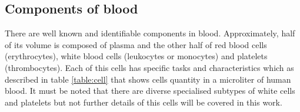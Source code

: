 \subsection{Components of blood}
\label{section2.1.1}
There are well known and identifiable components in blood. Approximately, half of its volume is composed of plasma and the other half of red blood cells (erythrocytes), white blood cells (leukocytes or monocytes) and platelets (thrombocytes). Each of this cells has specific tasks and characteristics which as described in table \ref{table:cell} that shows cells quantity in a microliter of human blood. It must be noted that there are diverse specialised subtypes of white cells and platelets but not further details of this cells will be covered in this work. 

